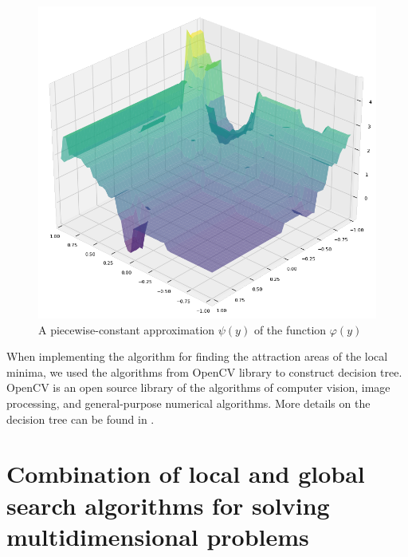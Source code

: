 \documentclass{svproc}
\begin{document}
\begin{figure}
	\begin{center}
		\begin{minipage}[h]{0.8\linewidth}
			\includegraphics[width=1\linewidth]{figure/fig4.png}
			\caption{A piecewise-constant  approximation $\psi(y)$ of the function $\varphi(y)$} %
			\label{fig:fig2_2}
		\end{minipage}
	\end{center}
\end{figure}	


When implementing the algorithm for finding the attraction areas of the local  minima, we used the algorithms from OpenCV library to construct decision tree. OpenCV is an open source library of the algorithms of computer vision, image processing, and  general-purpose numerical algorithms. More details on the decision tree can be found  in \cite{Brahmbhatt2013}.

\section{Combination of local and global search algorithms for solving multidimensional  problems}\label{SecGSAL}
\end{document}
